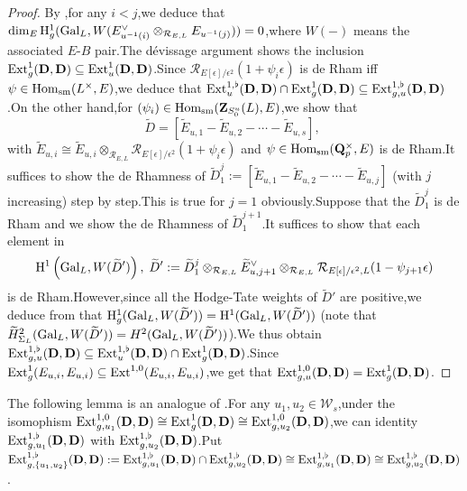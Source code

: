 \documentclass[10pt]{article}
\newcommand{\gal}{{\rm Gal}}
\newcommand{\homo}{{\rm Hom}}
\newcommand{\ext}{{\rm Ext}}
\newcommand{\hH}{{\mathrm{H}}}
\newcommand{\sm}{{\rm sm}}
\newcommand{\Dpik}{{\mathbf{D}}}
\newcommand{\bQ}{{\mathbf{Q}}}
\newcommand{\bZ}{{\mathbf{Z}}}
\newcommand{\cR}{\mathcal R}
\newcommand{\sW}{\mathscr W}
\begin{document}
\begin{proof}By \cite[Appendix,\;Proposition A.3]{Dingsocle},\;for any $i<j$,\;we deduce that $\dim_E\hH^1_g(\gal_L,W(E_{u^{-1}(i)}^{\vee}\otimes_{\cR_{E,L}}E_{u^{-1}(j)}))=0$,\;where $W(-)$ means the associated $E$-$B$ pair.\;The d\'{e}vissage argument shows the inclusion $\ext^1_g(\Dpik,\Dpik)\subseteq \ext^{1}_u(\Dpik,\Dpik)$.\;Since $\cR_{E[\epsilon]/\epsilon^2}(1+\psi_i\epsilon)$ is de Rham iff $\psi\in \homo_{\sm}(L^{\times},E)$,\;we deduce that $\ext^{1,\flat}_{u}(\Dpik,\Dpik)\cap \ext^1_g(\Dpik,\Dpik)\subseteq \ext^{1,\flat}_{g,u}(\Dpik,\Dpik)$.\;On the other hand,\;for $(\psi_i)\in \homo_{\sm}(\bZ_{S^u_0}(L),E)$,\;we show that \[\widetilde{D}=[	\widetilde{E}_{u,1}-\widetilde{E}_{u,2}-\cdots-	\widetilde{E}_{u,s}],\;\]
with $\widetilde{E}_{u,i}\cong \widetilde{E}_{u,i}\otimes_{\cR_{E,L}}\cR_{E[\epsilon]/\epsilon^2}(1+\psi_i\epsilon)$ and $\psi\in \homo_{\sm}(\bQ^{\times}_p,E)$ is de Rham.\;It suffices to show the de Rhamness of $\widetilde{D}_1^j:=[\widetilde{E}_{u,1}-\widetilde{E}_{u,2}-\cdots-\widetilde{E}_{u,j}]$ (with $j$ increasing) step by step.\;This is true for $j=1$ obviously.\;Suppose that the $\widetilde{D}_1^j$ is de Rham and we show the de Rhamness of $\widetilde{D}_1^{j+1}$.\;It suffices to show that each element in
\[\hH^1\left(\gal_L,W(\widetilde{D}')\right),\;\widetilde{D}':=\widetilde{D}_1^j\otimes_{\cR_{E,L}}\widetilde{E}_{u,j+1}^{\vee}\otimes_{\cR_{E,L}}\cR_{E[\epsilon]/\epsilon^2,L}(1-\psi_{j+1}\epsilon)\]
is de Rham.\;However,\;since all the Hodge-Tate weights of $\widetilde{D}'$ are positive,\;we deduce from \cite[Proposition A.3]{Dingsocle}  that $\hH_g^1(\gal_L,W(\widetilde{D}'))=\hH^1(\gal_L,W(\widetilde{D}'))$ (note that $\widetilde{H}^2_{\Sigma_L}(\gal_L,W(\widetilde{D}'))={H}^2(\gal_L,W(\widetilde{D}'))$).\;We thus obtain $\ext^{1,\flat}_{g,u}(\Dpik,\Dpik)\subseteq\ext^{1,\flat}_{u}(\Dpik,\Dpik)\cap \ext^1_g(\Dpik,\Dpik)$.\;Since $\ext^1_g(E_{u,i},E_{u,i})\subseteq \ext^{1,0}(E_{u,i},E_{u,i})$,\;we get that $\ext^{1,0}_{g,u}(\Dpik,\Dpik)=\ext^{1}_{g}(\Dpik,\Dpik)$. 
\end{proof}

The following lemma is an analogue of \cite[Lemma 2.11]{ParaDing2024}.\;For any $u_1,u_2\in \sW_s$,\;under the isomophism $\ext^{1,0}_{g,u_1}(\Dpik,\Dpik)\cong \ext^{1}_{g}(\Dpik,\Dpik)\cong \ext^{1,0}_{g,u_2}(\Dpik,\Dpik)$,\;we can identity $\ext^{1,\flat}_{g,u_1}(\Dpik,\Dpik)$ with $ \ext^{1,\flat}_{g,u_2}(\Dpik,\Dpik)$.\;Put
$\ext^{1,\flat}_{g,\{u_1,u_2\}}(\Dpik,\Dpik):=\ext^{1,\flat}_{g,u_1}(\Dpik,\Dpik)\cap \ext^{1,\flat}_{g,u_2}(\Dpik,\Dpik)\cong \ext^{1,\flat}_{g,u_1}(\Dpik,\Dpik)\cong \ext^{1,\flat}_{g,u_2}(\Dpik,\Dpik)$.\;
\end{document}
